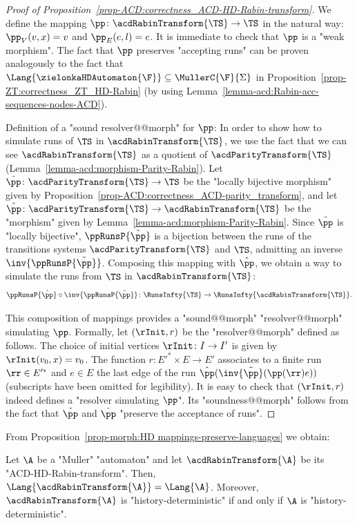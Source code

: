 \documentclass[10pt,a4paper]{amsart}
\renewcommand{\SS}{\Sigma}
\begin{document}
\begin{proof}[Proof of Proposition~\ref{prop-ACD:correctness_ACD-HD-Rabin-transform}]
	We define the mapping $\pp\colon \acdRabinTransform{\TS} \to \TS$ in the natural way: $\pp_V(v,x) = v$ and $\pp_E(e,l) = e$. It is immediate to check that $\pp$ is a "weak morphism". The fact that $\pp$ preserves "accepting runs" can be proven analogously to the fact that $\Lang{\zielonkaHDAutomaton{\F}} \subseteq \MullerC{\F}{\SS}$ in Proposition~\ref{prop-ZT:correctness_ZT_HD-Rabin} (by using Lemma~\ref{lemma-acd:Rabin-acc-sequences-nodes-ACD}).
	
	Definition of a "sound resolver@@morph" for $\pp$: In order to show how to simulate runs of $\TS$ in $\acdRabinTransform{\TS}$, we use the fact that we can see $\acdRabinTransform{\TS}$ as a quotient of $\acdParityTransform{\TS}$ (Lemma~\ref{lemma-acd:morphism-Parity-Rabin}). Let $\tilde{\pp}\colon \acdParityTransform{\TS} \to \TS$ be the "locally bijective morphism" given by Proposition~\ref{prop-ACD:correctness_ACD-parity_transform}, and let $\hat{\pp}\colon \acdParityTransform{\TS} \to \acdRabinTransform{\TS}$ be the "morphism" given by Lemma~\ref{lemma-acd:morphism-Parity-Rabin}.
	Since $\tilde{\pp}$ is "locally bijective", $\ppRunsP{\tilde{\pp}}$ is a bijection between the runs of the transitions systems $\acdParityTransform{\TS}$ and $\TS$, admitting an inverse $\inv{\ppRunsP{\tilde{\pp}}}$. Composing this mapping with $\hat{\pp}$, we obtain a way to simulate the runs from $\TS$ in $\acdRabinTransform{\TS}$:
	\[ \ppRunsP{\hat{\pp}} \circ \inv{\ppRunsP{\tilde{\pp}}} \colon \RunsInfty{\TS} \to \RunsInfty{\acdRabinTransform{\TS}}. \]
	
	This composition of mappings provides a "sound@@morph" "resolver@@morph" simulating $\pp$. Formally, let $(\rInit, r)$ be the "resolver@@morph" defined as follows. The choice of initial vertices $\rInit\colon I \to I'$ is given by $\rInit(v_0,x) = v_0$. The function $r\colon E'^* \times E \to E'$ associates to a finite run $\rr\in E'^*$ and $e\in E$ the last edge of the run $\hat{\pp}(\inv{\tilde{\pp}}(\pp(\rr)e))$ (subscripts have been omitted for legibility). It is easy to check that $(\rInit, r)$ indeed defines a "resolver simulating $\pp$". Its "soundness@@morph" follows from the fact that $\tilde{\pp}$ and $\hat{\pp}$ "preserve the acceptance of runs".
\end{proof}


From Proposition~\ref{prop-morph:HD mappings-preserve-languages} we obtain:

\begin{corollary}
	Let $\A$ be a "Muller" "automaton" and let $\acdRabinTransform{\A}$ be its "ACD-HD-Rabin-transform". Then, $\Lang{\acdRabinTransform{\A}} = \Lang{\A}$. Moreover, $\acdRabinTransform{\A}$  is "history-deterministic" if and only if $\A$ is "history-deterministic".
\end{corollary}
\end{document}
